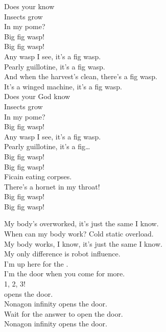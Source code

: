 Does your  know \\
Insects grow \\
In my pome? \\

Big fig wasp! \\
Big fig wasp! \\

Any wasp I see, it's a fig wasp. \\
Pearly guillotine, it's a fig wasp. \\
And when the harvest's clean, there's a fig wasp. \\
It's a winged machine, it's a fig wasp. \\

Does your God know \\
Insects grow \\
In my pome? \\

Big fig wasp! \\

Any wasp I see, it's a fig wasp. \\
Pearly guillotine, it's a fig… \\

Big fig wasp! \\
Big fig wasp! \\

Ficain eating corpses. \\
There's a hornet in my throat! \\

Big fig wasp! \\
Big fig wasp! \\


My body's overworked, it's just the same I know. \\
When can my body work? Cold static overload. \\
My body works, I know, it's just the same I know. \\
My only difference is robot influence. \\

I'm up here for the . \\
I'm the door when you come for more. \\

1, 2, 3! \\

 opens the door. \\
Nonagon infinity opens the door. \\
Wait for the answer to open the door. \\
Nonagon infinity opens the door. \\


